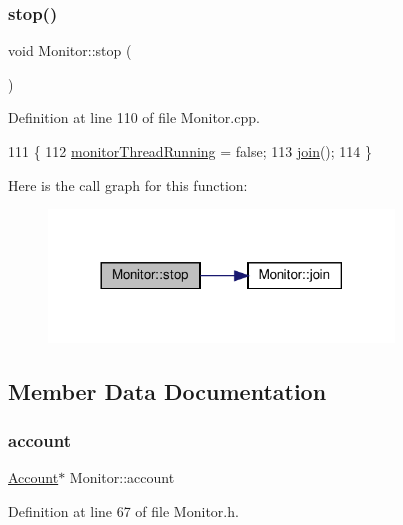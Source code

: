 \subsubsection{\texorpdfstring{stop()}{stop()}}
{\footnotesize\ttfamily void Monitor\+::stop (\begin{DoxyParamCaption}{ }\end{DoxyParamCaption})}



Definition at line 110 of file Monitor.\+cpp.


\begin{DoxyCode}
111 \{
112     \hyperlink{class_monitor_a63d26dffb146b9cfd0705163f3dc4745}{monitorThreadRunning} = \textcolor{keyword}{false};
113     \hyperlink{class_monitor_a2d2e309666c98333a317c9786f94f6ad}{join}();
114 \}
\end{DoxyCode}
Here is the call graph for this function\+:\nopagebreak
\begin{figure}[H]
\begin{center}
\leavevmode
\includegraphics[width=260pt]{d9/df7/class_monitor_a13fb20dc3bd5c8739f5a820cf7433cd8_cgraph}
\end{center}
\end{figure}


\subsection{Member Data Documentation}
\mbox{\label{class_monitor_acacff99178fbcd9eae50801acc346bf4}} 
\subsubsection{\texorpdfstring{account}{account}}
{\footnotesize\ttfamily \hyperlink{class_account}{Account}$\ast$ Monitor\+::account\hspace{0.3cm}{\ttfamily [private]}}



Definition at line 67 of file Monitor.\+h.


